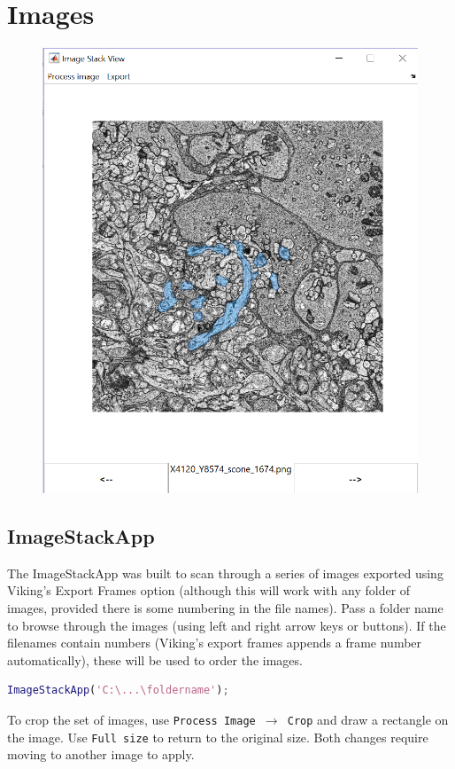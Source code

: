 \documentclass[12pt]{exam}
\begin{document}
	\section{Images}
	\begin{figure}
		\includegraphics[width=\linewidth]{imstackapp}
	\end{figure}
	\subsection{ImageStackApp}
	The ImageStackApp was built to scan through a series of images exported using Viking's Export Frames option (although this will work with any folder of images, provided there is some numbering in the file names). Pass a folder name to browse through the images (using left and right arrow keys or buttons). If the filenames contain numbers (Viking's export frames appends a frame number automatically), these will be used to order the images.
	\begin{lstlisting}[language=matlab]
	ImageStackApp('C:\...\foldername');\end{lstlisting}
	To crop the set of images, use \texttt{Process Image $\rightarrow$ Crop} and draw a rectangle on the image. Use \texttt{Full size} to return to the original size. Both changes require moving to another image to apply. 
\end{document}
